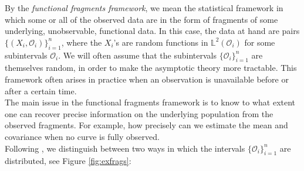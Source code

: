 \documentclass[10pt, a4paper]{report}
\newcommand{\Ll}[0]{\mathbb{L}}
\theoremstyle{definition}
\theoremstyle{remark}
\begin{document}
By the \textit{functional fragments framework}, we mean the statistical framework in which some or all of the observed data are in the form of fragments of some underlying, unobservable, functional data. In this case, the data at hand are pairs $\{(X_i,\mathcal{O}_i)\}_{i=1}^n$, where the $X_i$'s are random functions in $\Ll^2(\mathcal{O}_i)$ for some subintervals $\mathcal{O}_i$. We will often assume that the subintervals $\{\mathcal{O}_i\}_{i=1}^n$ are themselves random, in order to make the asymptotic theory more tractable. This framework often arises in practice when an observation is unavailable before or after a certain time.\\
The main issue in the functional fragments framework is to know to what extent one can recover precise information on the underlying population from the observed fragments. For example, how precisely can we estimate the mean and covariance when no curve is fully observed.\\
Following \cite{DP2}, we distinguish between two ways in which the intervals $\{\mathcal{O}_i\}_{i=1}^n$ are distributed, see Figure \ref{fig:exfrags}:\\
\end{document}
